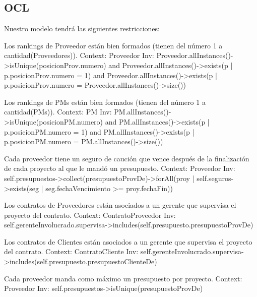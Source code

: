 \newpage
\subsection{OCL}
Nuestro modelo tendrá las siguientes restricciones:

\begin{listocl}

\begin{itemocl}{Los rankings de Proveedor están bien formados (tienen del número 1 a cantidad(Proveedores)).}
Context: Proveedor
Inv: Proveedor.allInstances()->isUnique(posicionProv.numero) and Proveedor.allInstances()->exists(p | p.posicionProv.numero = 1) and Proveedor.allInstances()->exists(p | p.posicionProv.numero = Proveedor.allInstances()->size())
\end{itemocl}

\begin{itemocl}{Los rankings de PMs están bien formados (tienen del número 1 a cantidad(PMs)).}
Context: PM
Inv: PM.allInstances()->isUnique(posicionPM.numero) and PM.allInstances()->exists(p | p.posicionPM.numero = 1) and PM.allInstances()->exists(p | p.posicionPM.numero = PM.allInstances()->size())
\end{itemocl}

\begin{itemocl}{Cada proveedor tiene un seguro de caución que vence después de la finalización de cada proyecto al que le mandó un presupuesto.}
Context: Proveedor
Inv: self.presupuestos->collect(presupuestoProvDe)->forAll(proy | self.seguros->exists(seg | seg.fechaVencimiento >= proy.fechaFin))
\end{itemocl}

\begin{itemocl}{Los contratos de Proveedores están asociados a un gerente que supervisa el proyecto del contrato.}
Context: ContratoProveedor
Inv: self.gerenteInvolucrado.supervisa->includes(self.presupuesto.presupuestoProvDe)
\end{itemocl}

\begin{itemocl}{Los contratos de Clientes están asociados a un gerente que supervisa el proyecto del contrato.}
Context: ContratoCliente
Inv: self.gerenteInvolucrado.supervisa->includes(self.presupuesto.presupuestoClienteDe)
\end{itemocl}

\begin{itemocl}{Cada proveedor manda como máximo un presupuesto por proyecto.}
Context: Proveedor
Inv: self.presupuestos->isUnique(presupuestoProvDe)
\end{itemocl}


\end{listocl}
